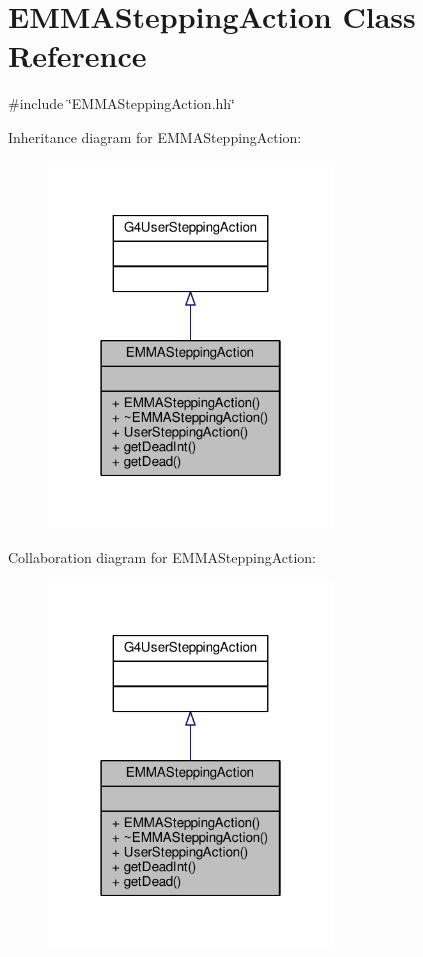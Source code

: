 \hypertarget{classEMMASteppingAction}{}\section{E\+M\+M\+A\+Stepping\+Action Class Reference}
\label{classEMMASteppingAction}


{\ttfamily \#include \char`\"{}E\+M\+M\+A\+Stepping\+Action.\+hh\char`\"{}}



Inheritance diagram for E\+M\+M\+A\+Stepping\+Action\+:
\nopagebreak
\begin{figure}[H]
\begin{center}
\leavevmode
\includegraphics[width=214pt]{classEMMASteppingAction__inherit__graph}
\end{center}
\end{figure}


Collaboration diagram for E\+M\+M\+A\+Stepping\+Action\+:
\nopagebreak
\begin{figure}[H]
\begin{center}
\leavevmode
\includegraphics[width=214pt]{classEMMASteppingAction__coll__graph}
\end{center}
\end{figure}
